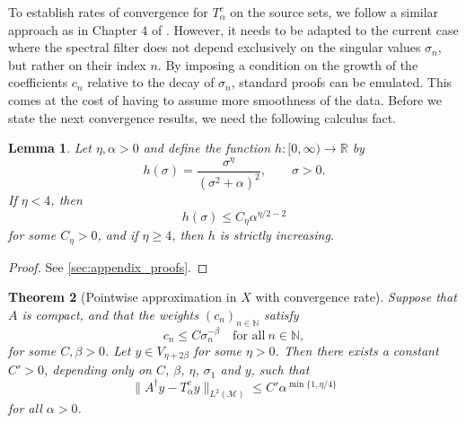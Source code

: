 \documentclass{article}
\newtheorem{theorem}{Theorem}[section]
\newtheorem{lemma}[theorem]{Lemma}
\theoremstyle{definition}
\newcommand{\N}{\mathbb{N}}
\newcommand{\R}{\mathbb{R}}
\newcommand{\smallnorm}[1]{\lVert#1\rVert}
\newcommand{\pseudoinv}[1]{{#1}^\dagger}
\begin{document}
To establish rates of convergence for \(T^c_\alpha\) on the source sets,
we follow a similar approach as in Chapter 4 of \cite{engl2000regularization}.
However, it needs to be adapted to the current case where the spectral filter does not depend exclusively on the singular values \(\sigma_n\), but rather on their index \(n\).
By imposing a condition on the growth of the coefficients \(c_n\) relative to the decay of \(\sigma_n\), standard proofs can be emulated.
This comes at the cost of having to assume more smoothness of the data.
Before we state the next convergence results, we need the following calculus fact.

\begin{lemma}
    \label{thm:spectralfilter_ratebound}
    Let \(\eta,\alpha>0\) and define the function \(h\colon [0,\infty)\to \R\) by
    \begin{equation*}
        h(\sigma) = \frac{\sigma^\eta}{\left(\sigma^2 + \alpha\right)^2},\qquad \sigma>0.
    \end{equation*}
    If \(\eta < 4\), then
    \begin{equation*}
        h(\sigma) \leq C_\eta \alpha^{\eta/2-2}
    \end{equation*}
    for some \(C_\eta>0\),
    and if \(\eta\geq 4\), then \(h\) is strictly increasing.
\end{lemma}
\begin{proof}
See \ref{sec:appendix_proofs}.
\end{proof}


\begin{theorem}[Pointwise approximation in \(X\) with convergence rate]
\label{thm:spectralfilter_pwl2approx_rate}
    Suppose that
    \(A\) is compact,
    and that the weights \((c_n)_{n\in\N}\) satisfy
    \begin{equation}
        \label{eq:spectralfilter_pwl2approx_rate_condition}
        c_n \leq C \sigma_n^{-\beta}\quad\text{for all}\ n\in\N,
    \end{equation}
    for some \(C, \beta>0\).
    Let \(y\in V_{\eta+2\beta}\) for some \(\eta>0\).
    Then there exists a constant \(C'>0\), depending only on $C$, $\beta$, $\eta$, $\sigma_1$ and $y$,
    such that
    \begin{equation*}
        \smallnorm{\pseudoinv{A} y - T^c_\alpha y}_{L^2(\mathcal{M})}
        \leq 
        C' \alpha^{\min\{1,\eta/4\}}
    \end{equation*}
    for all \(\alpha>0\).
\end{theorem}
\end{document}
